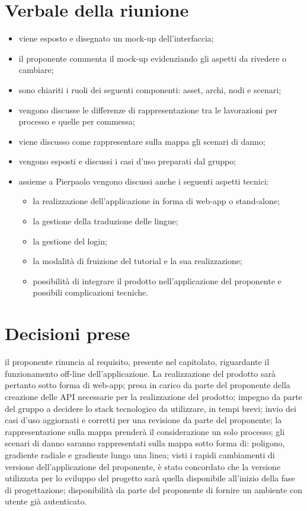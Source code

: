 \documentclass[a4paper,11pt]{article}
\begin{document}
	\section{Verbale della riunione}
	\begin{itemize}
		\item viene esposto e disegnato un mock-up dell'interfaccia;
        \item il proponente commenta il mock-up evidenziando gli aspetti da rivedere o cambiare;
		\item sono chiariti i ruoli dei seguenti componenti: asset, archi, nodi e scenari;
		\item vengono discusse le differenze di rappresentazione tra le lavorazioni per processo e quelle per commessa;
		\item viene discusso come rappresentare sulla mappa gli scenari di danno;
        \item vengono esposti e discussi i casi d'uso preparati dal gruppo;
		\item assieme a Pierpaolo vengono discussi anche i seguenti aspetti tecnici:
		\begin{itemize}
			\item la realizzazione dell'applicazione in forma di web-app o stand-alone;
			\item la gestione della traduzione delle lingue;
			\item la gestione del login;
			\item la modalità di fruizione del tutorial e la sua realizzazione;
			\item possibilità di integrare il prodotto nell'applicazione del proponente e possibili complicazioni tecniche.
		\end{itemize}
	\end{itemize}
	\section{Decisioni prese}
	\begin{itemize}
		\itemVE  il proponente rinuncia al requisito, presente nel capitolato, riguardante il funzionamento off-line dell'applicazione. La realizzazione del prodotto sarà pertanto sotto forma di web-app;
		\itemVE presa in carico da parte del proponente della creazione delle API necessarie per la realizzazione del prodotto;
		\itemVE impegno da parte del gruppo a decidere lo stack tecnologico da utilizzare, in tempi brevi;
		\itemVE invio dei casi d'uso aggiornati e corretti per una revisione da parte del proponente;
		\itemVE la rappresentazione sulla mappa prenderà il considerazione un solo processo;
		\itemVE gli scenari di danno saranno rappresentati sulla mappa sotto forma di: poligono, gradiente radiale e gradiente lungo una linea;
		\itemVE visti i rapidi cambiamenti di versione dell'applicazione del proponente, è stato concordato che la versione utilizzata per lo sviluppo del progetto sarà quella disponibile all'inizio della fase di progettazione;
		\itemVE disponibilità da parte del proponente di fornire un ambiente con utente già autenticato.
		
	\end{itemize}
\end{document}
